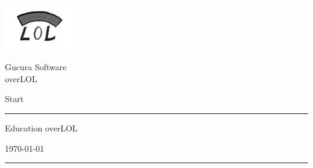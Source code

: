 	\thispagestyle{empty}
	\newcommand{\Rule}{\rule{\textwidth}{0.5mm}}
	\begin{center}
	{\Large \includegraphics[height=20mm]{img/overLOLlogo} \par}

	\vspace{0.5em}

	{\Large Gucura Software \\ overLOL \par}

	\vspace{0.5em}

	{\Large Start \the\year \par}


	\vspace{5cm}

	\Rule

	\vspace{1cm}

	{\Huge Education overLOL \par}

	\vspace{0.5em}

	{\Large \mysubject \par}

	\vspace{0.5em}

	{\small \today \par}

	\vspace{0.7cm}

	\Rule


	\vfill %


	\emph{\textbf{\mygroup}} \\[1em]
	\myauthor

	\end{center}